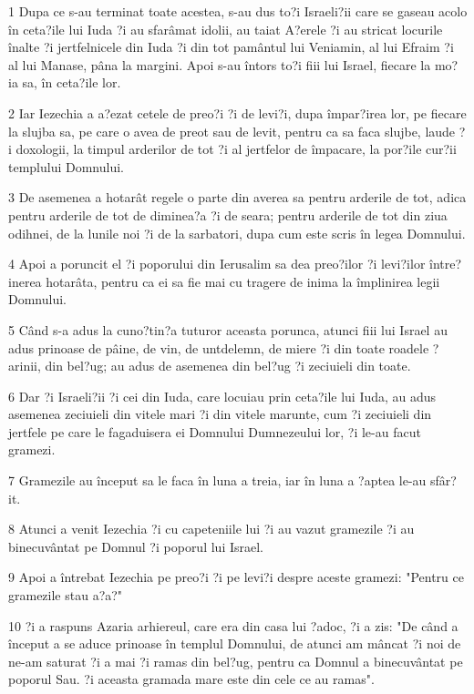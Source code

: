\par 1 Dupa ce s-au terminat toate acestea, s-au dus to?i Israeli?ii care se gaseau acolo în ceta?ile lui Iuda ?i au sfarâmat idolii, au taiat A?erele ?i au stricat locurile înalte ?i jertfelnicele din Iuda ?i din tot pamântul lui Veniamin, al lui Efraim ?i al lui Manase, pâna la margini. Apoi s-au întors to?i fiii lui Israel, fiecare la mo?ia sa, în ceta?ile lor.
\par 2 Iar Iezechia a a?ezat cetele de preo?i ?i de levi?i, dupa împar?irea lor, pe fiecare la slujba sa, pe care o avea de preot sau de levit, pentru ca sa faca slujbe, laude ?i doxologii, la timpul arderilor de tot ?i al jertfelor de împacare, la por?ile cur?ii templului Domnului.
\par 3 De asemenea a hotarât regele o parte din averea sa pentru arderile de tot, adica pentru arderile de tot de diminea?a ?i de seara; pentru arderile de tot din ziua odihnei, de la lunile noi ?i de la sarbatori, dupa cum este scris în legea Domnului.
\par 4 Apoi a poruncit el ?i poporului din Ierusalim sa dea preo?ilor ?i levi?ilor între?inerea hotarâta, pentru ca ei sa fie mai cu tragere de inima la împlinirea legii Domnului.
\par 5 Când s-a adus la cuno?tin?a tuturor aceasta porunca, atunci fiii lui Israel au adus prinoase de pâine, de vin, de untdelemn, de miere ?i din toate roadele ?arinii, din bel?ug; au adus de asemenea din bel?ug ?i zeciuieli din toate.
\par 6 Dar ?i Israeli?ii ?i cei din Iuda, care locuiau prin ceta?ile lui Iuda, au adus asemenea zeciuieli din vitele mari ?i din vitele marunte, cum ?i zeciuieli din jertfele pe care le fagaduisera ei Domnului Dumnezeului lor, ?i le-au facut gramezi.
\par 7 Gramezile au început sa le faca în luna a treia, iar în luna a ?aptea le-au sfâr?it.
\par 8 Atunci a venit Iezechia ?i cu capeteniile lui ?i au vazut gramezile ?i au binecuvântat pe Domnul ?i poporul lui Israel.
\par 9 Apoi a întrebat Iezechia pe preo?i ?i pe levi?i despre aceste gramezi: "Pentru ce gramezile stau a?a?"
\par 10 ?i a raspuns Azaria arhiereul, care era din casa lui ?adoc, ?i a zis: "De când a început a se aduce prinoase în templul Domnului, de atunci am mâncat ?i noi de ne-am saturat ?i a mai ?i ramas din bel?ug, pentru ca Domnul a binecuvântat pe poporul Sau. ?i aceasta gramada mare este din cele ce au ramas".
